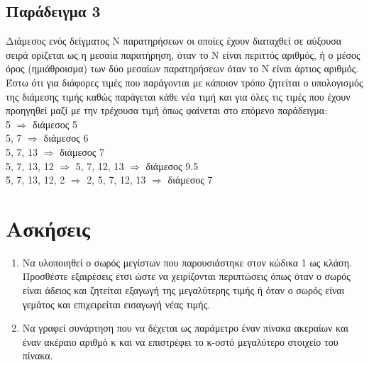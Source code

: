 




\subsection{Παράδειγμα 3}
Διάμεσος ενός δείγματος Ν παρατηρήσεων οι οποίες έχουν διαταχθεί σε αύξουσα σειρά ορίζεται ως η μεσαία παρατήρηση, όταν το Ν είναι περιττός αριθμός, ή ο μέσος όρος (ημιάθροισμα) των δύο μεσαίων παρατηρήσεων όταν το Ν είναι άρτιος αριθμός. 
Έστω ότι για διάφορες τιμές που παράγονται με κάποιον τρόπο ζητείται ο υπολογισμός της διάμεσης  τιμής καθώς παράγεται κάθε νέα τιμή και για όλες τις τιμές που έχουν προηγηθεί μαζί με την τρέχουσα τιμή όπως φαίνεται στο επόμενο παράδειγμα:\\ 
5  $\Rightarrow$  διάμεσος 5\\
5, 7 $\Rightarrow$ διάμεσος 6\\
5, 7, 13 $\Rightarrow$ διάμεσος 7\\
5, 7, 13, 12 $\Rightarrow$ 5, 7, 12, 13 $\Rightarrow$ διάμεσος 9.5\\
5, 7, 13, 12, 2 $\Rightarrow$ 2, 5, 7, 12, 13 $\Rightarrow$ διάμεσος 7






\section{Ασκήσεις}
\begin{enumerate}[nolistsep]
\item Να υλοποιηθεί ο σωρός μεγίστων που παρουσιάστηκε στον κώδικα 1 ως κλάση. Προσθέστε εξαιρέσεις έτσι ώστε να χειρίζονται περιπτώσεις όπως όταν ο σωρός είναι άδειος και ζητείται εξαγωγή της μεγαλύτερης τιμής ή όταν ο σωρός είναι γεμάτος και επιχειρείται εισαγωγή νέας τιμής.
\item Να γραφεί συνάρτηση που να δέχεται ως παράμετρο έναν πίνακα ακεραίων και έναν ακέραιο αριθμό κ και να επιστρέφει το κ-οστό μεγαλύτερο στοιχείο του πίνακα. 
\end{enumerate}

